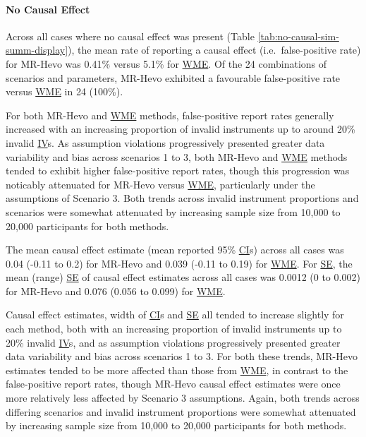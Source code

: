 \documentclass[
]{article}
\begin{document}
\paragraph{No Causal Effect}\label{results-sim-no-causal}

\leavevmode\newline Across all cases where no causal effect was present (Table \ref{tab:no-causal-sim-summ-display}), the mean rate of reporting a causal effect (i.e.~false-positive rate) for MR-Hevo was 0.41\% versus 5.1\% for \hyperref[acronyms_WME]{WME}. Of the 24 combinations of scenarios and parameters, MR-Hevo exhibited a favourable false-positive rate versus \hyperref[acronyms_WME]{WME} in 24 (100\%).

For both MR-Hevo and \hyperref[acronyms_WME]{WME} methods, false-positive report rates generally increased with an increasing proportion of invalid instruments up to around 20\% invalid \hyperref[acronyms_IV]{IV}s. As assumption violations progressively presented greater data variability and bias across scenarios 1 to 3, both MR-Hevo and \hyperref[acronyms_WME]{WME} methods tended to exhibit higher false-positive report rates, though this progression was noticably attenuated for MR-Hevo versus \hyperref[acronyms_WME]{WME}, particularly under the assumptions of Scenario 3. Both trends across invalid instrument proportions and scenarios were somewhat attenuated by increasing sample size from 10,000 to 20,000 participants for both methods.

The mean causal effect estimate (mean reported 95\% \hyperref[acronyms_CI]{CI}s) across all cases was 0.04 (-0.11 to 0.2) for MR-Hevo and 0.039 (-0.11 to 0.19) for \hyperref[acronyms_WME]{WME}. For \hyperref[acronyms_SE]{SE}, the mean (range) \hyperref[acronyms_SE]{SE} of causal effect estimates across all cases was 0.0012 (0 to 0.002) for MR-Hevo and 0.076 (0.056 to 0.099) for \hyperref[acronyms_WME]{WME}.

Causal effect estimates, width of \hyperref[acronyms_CI]{CI}s and \hyperref[acronyms_SE]{SE} all tended to increase slightly for each method, both with an increasing proportion of invalid instruments up to 20\% invalid \hyperref[acronyms_IV]{IV}s, and as assumption violations progressively presented greater data variability and bias across scenarios 1 to 3. For both these trends, MR-Hevo estimates tended to be more affected than those from \hyperref[acronyms_WME]{WME}, in contrast to the false-positive report rates, though MR-Hevo causal effect estimates were once more relatively less affected by Scenario 3 assumptions. Again, both trends across differing scenarios and invalid instrument proportions were somewhat attenuated by increasing sample size from 10,000 to 20,000 participants for both methods.
\end{document}
